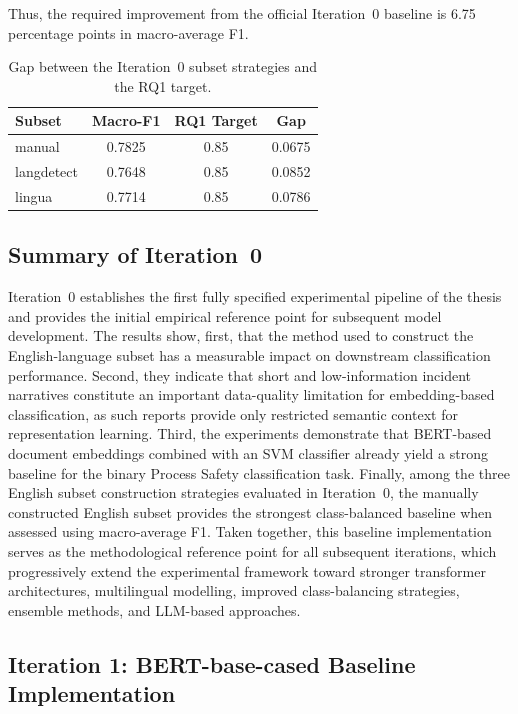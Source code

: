 \documentclass[11pt, titlepage, bibliography=totoc]{scrreprt}
\begin{document}
Thus, the required improvement from the official Iteration~0 baseline is 6.75 percentage points in macro-average F1.

\begin{table}[h!]
\centering
\caption{Gap between the Iteration~0 subset strategies and the RQ1 target.}
\label{tab:iter0_gap_analysis}
\begin{tabular}{lccc}
\toprule
\textbf{Subset} & \textbf{Macro-F1} & \textbf{RQ1 Target} & \textbf{Gap} \\
\midrule
manual     & 0.7825 & 0.85 & 0.0675 \\
langdetect & 0.7648 & 0.85 & 0.0852 \\
lingua     & 0.7714 & 0.85 & 0.0786 \\
\bottomrule
\end{tabular}
\end{table}

\subsection{Summary of Iteration~0}

Iteration~0 establishes the first fully specified experimental pipeline of the thesis and provides the initial empirical reference point for subsequent model development. The results show, first, that the method used to construct the English-language subset has a measurable impact on downstream classification performance. Second, they indicate that short and low-information incident narratives constitute an important data-quality limitation for embedding-based classification, as such reports provide only restricted semantic context for representation learning. Third, the experiments demonstrate that BERT-based document embeddings combined with an SVM classifier already yield a strong baseline for the binary Process Safety classification task. Finally, among the three English subset construction strategies evaluated in Iteration~0, the manually constructed English subset provides the strongest class-balanced baseline when assessed using macro-average F1. Taken together, this baseline implementation serves as the methodological reference point for all subsequent iterations, which progressively extend the experimental framework toward stronger transformer architectures, multilingual modelling, improved class-balancing strategies, ensemble methods, and LLM-based approaches.

\subsection{Iteration 1: BERT-base-cased Baseline Implementation}
\end{document}
